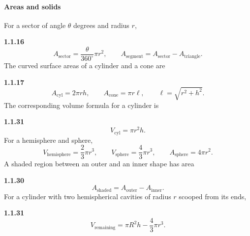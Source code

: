 \paragraph*{Areas and solids}
For a sector of angle $\theta$ degrees and radius $r$,
\setcounter{qcurrent}{16}\setcounter{equation}{0}
\par\noindent\textbf{1.1.16}\quad
\begin{equation}
A_{\mathrm{sector}}=\frac{\theta}{360^\circ}\pi r^2,\qquad
A_{\mathrm{segment}}=A_{\mathrm{sector}}-A_{\mathrm{triangle}}.
\label{eq:sector-segment}
\end{equation}
The curved surface areas of a cylinder and a cone are
\setcounter{qcurrent}{17}\setcounter{equation}{0}
\par\noindent\textbf{1.1.17}\quad
\begin{equation}
A_{\mathrm{cyl}}=2\pi rh,\qquad A_{\mathrm{cone}}=\pi r\ell,\qquad \ell=\sqrt{r^2+h^2}.
\label{eq:cone-formula}
\end{equation}
The corresponding volume formula for a cylinder is
\setcounter{qcurrent}{31}\setcounter{equation}{0}
\par\noindent\textbf{1.1.31}\quad
\begin{equation}
V_{\mathrm{cyl}}=\pi r^2h.
\label{eq:cylinder-formula}
\end{equation}
For a hemisphere and sphere,
\setcounter{qcurrent}{31}\setcounter{equation}{0}
\setcounter{qcurrent}{31}\setcounter{equation}{1}
\begin{equation}
V_{\mathrm{hemisphere}}=\frac23\pi r^3,\qquad V_{\mathrm{sphere}}=\frac43\pi r^3,
\qquad A_{\mathrm{sphere}}=4\pi r^2.
\label{eq:sphere-formula}
\end{equation}
A shaded region between an outer and an inner shape has area
\par\noindent\textbf{1.1.30}\quad
\begin{equation}
A_{\mathrm{shaded}}=A_{\mathrm{outer}}-A_{\mathrm{inner}}.\tag{1.1.30.1}\label{eq:shaded-area}
\end{equation}
For a cylinder with two hemispherical cavities of radius $r$ scooped from its ends,
\setcounter{qcurrent}{31}\setcounter{equation}{0}
\setcounter{qcurrent}{31}\setcounter{equation}{2}
\par\noindent\textbf{1.1.31}\quad
\begin{equation}
V_{\mathrm{remaining}}=\pi R^2h-\frac43\pi r^3.
\label{eq:scooped-cylinder}
\end{equation}

